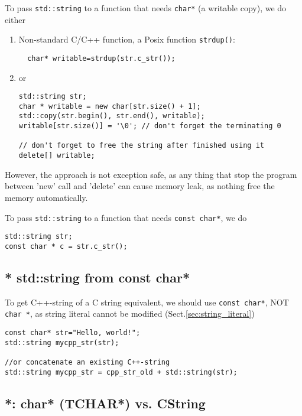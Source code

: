 To pass \verb!std::string! to a function that needs \verb!char*! (a writable
copy), we do either
\begin{enumerate}
  \item Non-standard C/C++ function, a Posix function \verb!strdup()!:
  \begin{verbatim}
  char* writable=strdup(str.c_str());
  \end{verbatim}
  
  \item or
\begin{verbatim}
std::string str;
char * writable = new char[str.size() + 1];
std::copy(str.begin(), str.end(), writable);
writable[str.size()] = '\0'; // don't forget the terminating 0

// don't forget to free the string after finished using it
delete[] writable;
\end{verbatim}
\end{enumerate}
However, the approach is not exception safe, as any thing that stop the program
between 'new' call and 'delete' can cause memory leak, as nothing free the
memory automatically. 


To pass \verb!std::string! to a function that needs \verb!const char*!, we do
\begin{verbatim}
std::string str;
const char * c = str.c_str();
\end{verbatim}

\subsection{* std::string from const char*}

To get C++-string of a C string equivalent, we should use \verb!const char*!,
NOT \verb!char *!, as string literal cannot be modified
(Sect.\ref{sec:string_literal})

\begin{verbatim}
const char* str="Hello, world!";
std::string mycpp_str(str);

//or concatenate an existing C++-string
std::string mycpp_str = cpp_str_old + std::string(str);
\end{verbatim}
 

\subsection{*: char* (TCHAR*) vs. CString}


